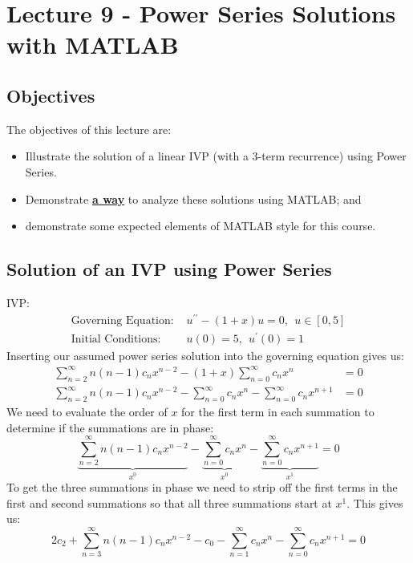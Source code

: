 \chapter{Lecture 9 - Power Series Solutions with MATLAB}
\label{ch:lec9}
\section{Objectives}
The objectives of this lecture are:
\begin{itemize}
\item Illustrate the solution of a linear IVP (with a 3-term recurrence) using Power Series.
\item Demonstrate \textbf\underline{a way} to analyze these solutions using MATLAB; and
\item demonstrate some expected elements of MATLAB style for this course.
\end{itemize}

\section{Solution of an IVP using Power Series}

 IVP:
\begin{align*}
\text{Governing Equation:   }& u^{\prime \prime}-(1+x)u = 0, \ \ u\in[0,5]\\
\text{Initial Conditions:   }& u(0) = 5, \ \ u^{\prime}(0) = 1
\end{align*}
Inserting our assumed power series solution into the governing equation gives us:
\begin{align*}
\sum\limits_{n=2}^{\infty}n(n-1)c_nx^{n-2} - (1+x)\sum\limits_{n=0}^{\infty}c_nx^n &= 0 \\
\sum\limits_{n=2}^{\infty}n(n-1)c_nx^{n-2} - \sum\limits_{n=0}^{\infty}c_nx^{n} - \sum\limits_{n=0}^{\infty}c_nx^{n+1} &= 0
\end{align*}
\noindent We need to evaluate the order of $x$ for the first term in each summation to determine if the summations are in phase:
\begin{equation*}
\underbrace{\sum\limits_{n=2}^{\infty}n(n-1)c_nx^{n-2}}_{x^0} - \underbrace{\sum\limits_{n=0}^{\infty}c_nx^{n}}_{x^0} - \underbrace{\sum\limits_{n=0}^{\infty}c_nx^{n+1}}_{x^1} = 0
\end{equation*}
To get the three summations in phase we need to strip off the first terms in the first and second summations so that all three summations start at $x^{1}$.  This gives us:
\begin{equation*}
2c_2 + \sum\limits_{n=3}^{\infty}n(n-1)c_nx^{n-2} - c_0 - \sum\limits_{n=1}^{\infty} c_nx^n -\sum\limits_{n=0}^{\infty}c_nx^{n+1} = 0
\end{equation*}

